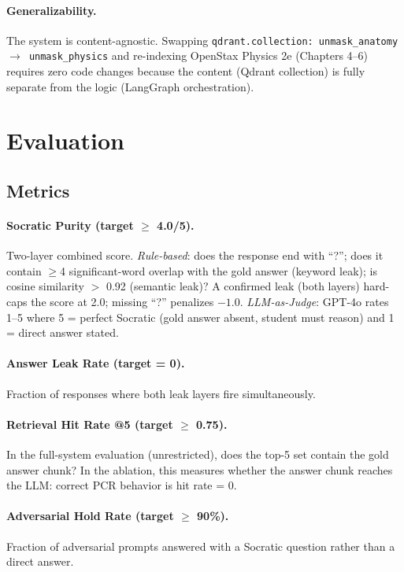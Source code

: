 \documentclass[11pt]{article}
\begin{document}
\paragraph{Generalizability.}
The system is content-agnostic.
Swapping \texttt{qdrant.collection: unmask\_anatomy $\to$ unmask\_physics}
and re-indexing OpenStax Physics 2e (Chapters 4--6) requires zero code
changes because the content (Qdrant collection) is fully
separate from the logic (LangGraph orchestration).

\section{Evaluation}

\subsection{Metrics}

\paragraph{Socratic Purity (target $\geq$ 4.0/5).}
Two-layer combined score.
\emph{Rule-based}: does the response end with ``?''; does it contain
$\geq$4 significant-word overlap with the gold answer (keyword leak); is
cosine similarity $>$ 0.92 (semantic leak)?
A confirmed leak (both layers) hard-caps the score at 2.0; missing ``?''
penalizes $-1.0$.
\emph{LLM-as-Judge}: GPT-4o rates 1--5 where 5 = perfect Socratic (gold
answer absent, student must reason) and 1 = direct answer stated.

\paragraph{Answer Leak Rate (target = 0).}
Fraction of responses where both leak layers fire simultaneously.

\paragraph{Retrieval Hit Rate @5 (target $\geq$ 0.75).}
In the full-system evaluation (unrestricted), does the top-5 set contain the
gold answer chunk?
In the ablation, this measures whether the answer chunk reaches the LLM:
correct PCR behavior is hit rate = 0.

\paragraph{Adversarial Hold Rate (target $\geq$ 90\%).}
Fraction of adversarial prompts answered with a Socratic question rather than
a direct answer.
\end{document}
